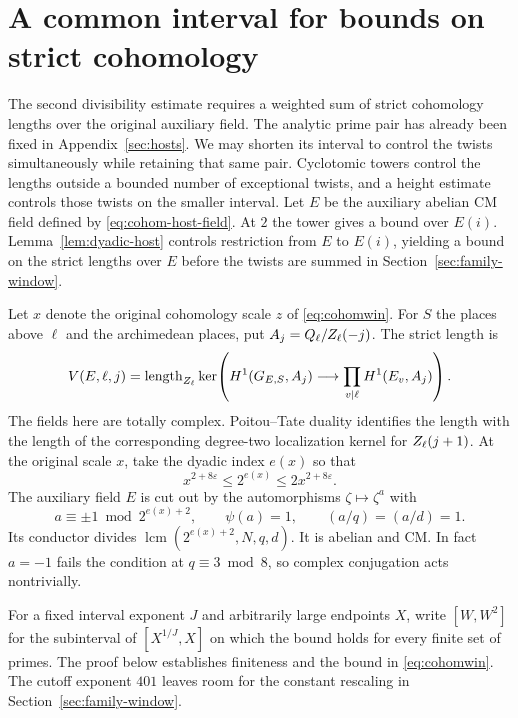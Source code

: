 \section{A common interval for bounds on strict cohomology}\label{sec:cohomology}

The second divisibility estimate requires a weighted sum of strict cohomology lengths over the original auxiliary field. The analytic prime pair has already been fixed in Appendix~\ref{sec:hosts}. We may shorten its interval to control the twists simultaneously while retaining that same pair.
Cyclotomic towers control the lengths outside a bounded
number of exceptional twists, and a height estimate controls
those twists on the smaller interval. Let \(E\) be the auxiliary abelian CM field defined by \eqref{eq:cohom-host-field}. At \(2\) the tower gives a bound over \(E(i)\). Lemma~\ref{lem:dyadic-host} controls restriction from \(E\) to \(E(i)\), yielding a bound on the strict lengths over \(E\) before the twists are summed in Section~\ref{sec:family-window}.

Let \(x\) denote the original cohomology scale \(z\) of
\eqref{eq:cohomwin}. For \(S\) the places above \(\ell\) and the
archimedean places, put \(A_j=Q_\ell/Z_\ell(-j)\). The strict
length is
\[
 V(E,\ell,j)=\operatorname{length}_{Z_\ell}
   \ker\!\left(H^1(G_{E,S},A_j)\longrightarrow
                    \prod_{v\mid\ell}H^1(E_v,A_j)\right).
\]
The fields here are totally complex. Poitou--Tate duality identifies
the length with the length of the corresponding degree-two
localization kernel for \(Z_\ell(j+1)\).
At the original scale \(x\), take the dyadic index \(e(x)\) so that
\begin{equation}\label{eq:cohom-host-dyadic-level}
 x^{2+8\varepsilon}\le 2^{e(x)}\le2x^{2+8\varepsilon}.
\end{equation}
The auxiliary field \(E\) is cut out by the automorphisms
\(\zeta\mapsto\zeta^a\) with
\begin{equation}\label{eq:cohom-host-field}
 a\equiv\pm1\bmod 2^{e(x)+2},\qquad
 \psi(a)=1,\qquad (a/q)=(a/d)=1.
\end{equation}
Its conductor divides \(\operatorname{lcm}(2^{e(x)+2},N,q,d)\).
It is abelian and CM. In fact \(a=-1\) fails the condition at
\(q\equiv3\bmod8\), so complex conjugation acts nontrivially.

For a fixed interval exponent \(J\) and arbitrarily large
endpoints \(X\), write \([W,W^2]\) for the
subinterval of \([X^{1/J},X]\) on which the bound holds for
every finite set of primes. The proof below establishes
finiteness and the bound in \eqref{eq:cohomwin}. The cutoff
exponent \(401\) leaves room for the constant rescaling
in Section~\ref{sec:family-window}.

